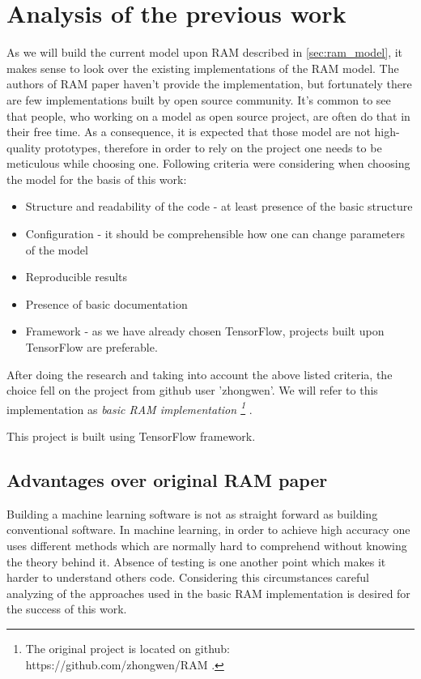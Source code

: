\section{Analysis of the previous work}
As we will build the current model upon RAM described
in \autoref{sec:ram_model}, it makes sense to look over the existing implementations
of the RAM model.
The authors of RAM paper haven't provide the implementation, but
fortunately there are few implementations built by open source community.
It's common to see that people, who working on a model as open source project,
are often do that in their free time. As a consequence, it is expected that those model
are not high-quality prototypes, therefore in order to rely on the project
one needs to be meticulous while choosing one.
Following criteria were considering when choosing the model for the basis
of this work:

\begin{itemize}
	\item Structure and readability of the code - at least presence of the basic structure
	\item Configuration - it should be comprehensible how one can change parameters
		of the model
	\item Reproducible results
	\item Presence of basic documentation
	\item Framework - as we have already chosen TensorFlow, projects built upon
		TensorFlow are preferable.
\end{itemize}

After doing the research and taking into account the above listed criteria,
the choice fell on the project from github user 'zhongwen'. We will refer to
this implementation as \emph{
	basic RAM implementation
	\footnote{The original project is located on github: https://github.com/zhongwen/RAM .}
}.

This project is built using TensorFlow framework.

\subsection{Advantages over original RAM paper}
Building a machine learning software is not as straight forward as building
conventional software. In machine learning, in order to achieve high accuracy
one uses different methods which are normally hard to comprehend without knowing
the theory behind it. Absence of testing is one another point which makes it
harder to understand others code. Considering this circumstances careful
analyzing of the approaches used in the basic RAM implementation
is desired for the success of this work.

